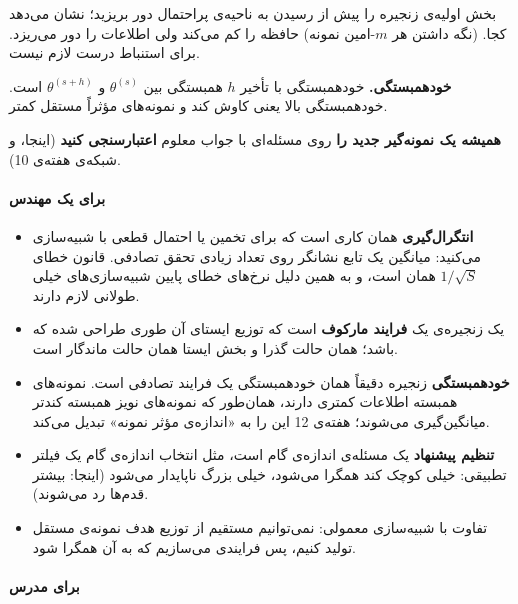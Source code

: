 \textbf{} بخش اولیه‌ی زنجیره را پیش از رسیدن به ناحیه‌ی
پراحتمال دور بریزید؛  نشان می‌دهد کجا.
\textbf{} (نگه داشتن هر \(m\)-امین نمونه) حافظه را کم می‌کند
ولی اطلاعات را دور می‌ریزد. برای استنباط درست لازم نیست.

\textbf{خودهمبستگی.} خودهمبستگی با تأخیر \(h\) همبستگی بین
\(\theta^{(s)}\) و \(\theta^{(s+h)}\) است. خودهمبستگی بالا یعنی کاوش کند
و نمونه‌های مؤثراً مستقل کمتر.

\textbf{همیشه یک نمونه‌گیر جدید را} روی مسئله‌ای با جواب معلوم
\textbf{اعتبارسنجی کنید} (اینجا،  و شبکه‌ی
هفته‌ی 10).

\paragraph{برای یک مهندس}

\begin{itemize}
\tightlist
\item
  \textbf{انتگرال‌گیری } همان کاری است که برای تخمین
   یا احتمال قطعی  با شبیه‌سازی می‌کنید: میانگین یک
  تابع نشانگر روی تعداد زیادی تحقق تصادفی. قانون خطای \(1/\sqrt{S}\)
  همان است، و به همین دلیل نرخ‌های خطای پایین شبیه‌سازی‌های خیلی طولانی
  لازم دارند.
\item
  یک زنجیره‌ی  یک \textbf{فرایند مارکوف} است که توزیع ایستای آن
  طوری طراحی شده که  باشد؛  همان حالت گذرا و
  بخش ایستا همان حالت ماندگار است.
\item
  \textbf{خودهمبستگی} زنجیره دقیقاً همان خودهمبستگی یک فرایند تصادفی است.
  نمونه‌های همبسته اطلاعات کمتری دارند، همان‌طور که نمونه‌های نویز همبسته
  کندتر میانگین‌گیری می‌شوند؛ هفته‌ی 12 این را به «اندازه‌ی مؤثر نمونه»
  تبدیل می‌کند.
\item
  \textbf{تنظیم پیشنهاد } یک مسئله‌ی اندازه‌ی گام است، مثل
  انتخاب اندازه‌ی گام یک فیلتر تطبیقی: خیلی کوچک کند همگرا می‌شود، خیلی
  بزرگ ناپایدار می‌شود (اینجا: بیشتر قدم‌ها رد می‌شوند).
\item
  تفاوت با شبیه‌سازی معمولی: نمی‌توانیم مستقیم از توزیع هدف نمونه‌ی مستقل
  تولید کنیم، پس فرایندی می‌سازیم که به آن همگرا شود.
\end{itemize}

\paragraph{برای مدرس}

